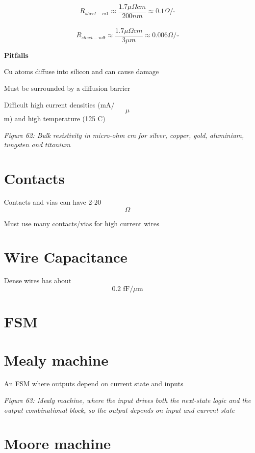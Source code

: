 \[R_{sheet-m1} \approx \frac{1.7 \mu\Omega cm}{200 nm} \approx 0.1 \Omega/\square\]\\
\[R_{sheet-m9} \approx \frac{1.7 \mu\Omega cm}{3 \mu m} \approx 0.006 \Omega/\square\]

\textbf{Pitfalls}

Cu atoms diffuse into silicon and can cause damage

Must be surrounded by a diffusion barrier

Difficult high current densities (mA/\[\mu\]m) and high temperature (125
C)


{
\centering
{}
}

\emph{Figure 62: Bulk resistivity in micro-ohm cm for silver, copper,
gold, aluminium, tungsten and titanium}

\section{Contacts}\label{contacts}

Contacts and vias can have 2-20 \[\Omega\]

Must use many contacts/vias for high current wires

\section{Wire Capacitance}\label{wire-capacitance}

Dense wires has about \[0.2 \text{ fF/}\mu\text{m}\]

\section{FSM}\label{fsm}

\section{Mealy machine}\label{mealy-machine}

An FSM where outputs depend on current state and inputs


{
\centering
{}
}

\emph{Figure 63: Mealy machine, where the input drives both the
next-state logic and the output combinational block, so the output
depends on input and current state}

\section{Moore machine}\label{moore-machine}

